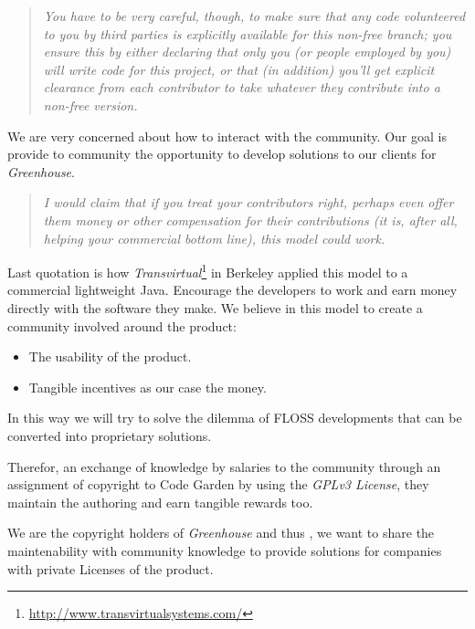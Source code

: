 \documentclass[11pt]{scrartcl}
\begin{document}
\begin{quotation}
    \emph{You have to be very careful, though, to make sure that any code volunteered to you by third parties is explicitly available for this non-free branch; you ensure this by either declaring that only you (or people employed by you) will write code for this project, or that (in addition) you'll get explicit clearance from each contributor to take whatever they contribute into a non-free version.}
\end{quotation}

\par We are very concerned about how to interact with the community. Our goal is provide to community the opportunity to develop solutions to our clients for \emph{Greenhouse}.

\begin{quotation}
    \emph{I would claim that if you treat your contributors right, perhaps even offer them money or other compensation for their contributions (it is, after all, helping your commercial bottom line), this model could work.}
\end{quotation}

\par Last quotation is how \emph{Transvirtual}\footnote{\url{http://www.transvirtualsystems.com/}} in Berkeley applied this model to a commercial lightweight Java. Encourage the developers to work and earn money directly with the software they make. We believe in this model to create a community involved around the product: 

\begin{itemize}
	\item The usability of the product.
	\item Tangible incentives as our case the money.
\end{itemize}

\par In this way we will try to solve the dilemma of FLOSS developments that can be converted into proprietary solutions.

\par Therefor, an exchange of knowledge by salaries to the community through an assignment of copyright to Code Garden by using the \emph{GPLv3 License}, they maintain the authoring and earn tangible rewards too.

\par We are the copyright holders of \emph{Greenhouse} and thus , we want to share the maintenability with community knowledge to provide solutions for companies with private Licenses of the product.
\end{document}
